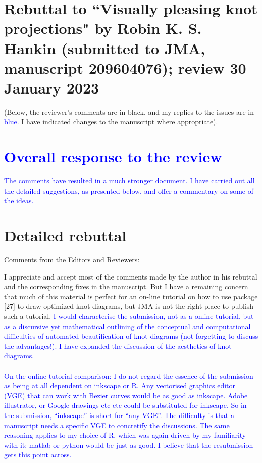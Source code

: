 \documentclass[12pt]{article}
\begin{document}
\section*{Rebuttal to ``Visually pleasing knot projections" by
  Robin K. S. Hankin (submitted to JMA, manuscript 209604076); review
  30 January 2023}

(Below, the reviewer's comments are in black, and my replies to the
issues are in \textcolor{blue}{blue}.  I have indicated changes to the
manuscript where appropriate).

\section*{\textcolor{blue}{Overall response to the review}}

\textcolor{blue}{The comments have resulted in a much stronger
  document.  I have carried out all the detailed suggestions, as
  presented below, and offer a commentary on some of the ideas.}

\section*{Detailed rebuttal}

Comments from the Editors and Reviewers:

I appreciate and accept most of the comments made by the author in his
rebuttal and the corresponding fixes in the manuscript.  But I have a
remaining concern that much of this material is perfect for an on-line
tutorial on how to use package [27] to draw optimized knot diagrams,
but JMA is not the right place to publish such a
tutorial.\textcolor{blue}{ I would characterise the submission, not as
  a online tutorial, but as a discursive yet mathematical outlining of
  the conceptual and computational difficulties of automated
  beautification of knot diagrams (not forgetting to discuss the
  advantages!).  I have expanded the discussion of the aesthetics of
  knot diagrams.  \\ \\ On the online tutorial comparison: I do not
  regard the essence of the submission as being at all dependent on
  inkscape or R.  Any vectorised graphics editor (VGE) that can work
  with Bezier curves would be as good as inkscape.  Adobe illustrator,
  or Google drawings etc etc could be substituted for inkscape.  So in
  the submission, ``inkscape'' is short for ``any VGE''.  The
  difficulty is that a manuscript needs a specific VGE to concretify
  the discussions.  The same reasoning applies to my choice of R,
  which was again driven by my familiarity with it; matlab or python
  would be just as good.  I believe that the resubmission gets this
  point across.}
\end{document}
